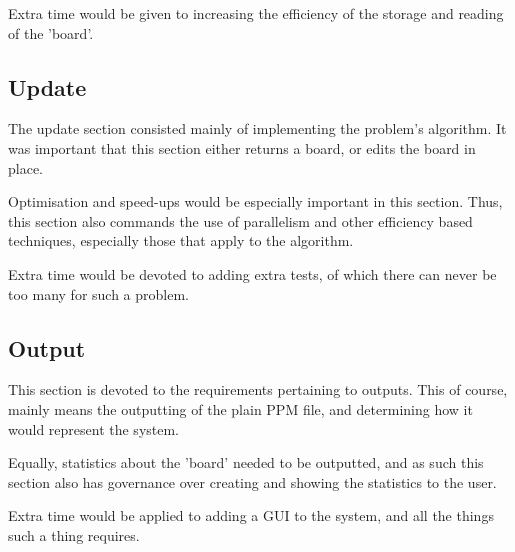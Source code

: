 		Extra time would be given to increasing the efficiency of the storage and reading of the 'board'.
	\subsection{Update}
		The update section consisted mainly of implementing the problem's algorithm.
		It was important that this section either returns a board, or edits the board in place.
		
		Optimisation and speed-ups would be especially important in this section.
		Thus, this section also commands the use of parallelism and other efficiency based techniques, especially those that apply to the algorithm.
		
		Extra time would be devoted to adding extra tests, of which there can never be too many for such a problem.
		
	\subsection{Output}
		This section is devoted to the requirements pertaining to outputs.
		This of course, mainly means the outputting of the plain PPM file, and determining how it would represent the system.

		Equally, statistics about the 'board' needed to be outputted, and as such this section also has governance over creating and showing the statistics to the user.

		Extra time would be applied to adding a GUI to the system, and all the things such a thing requires.
